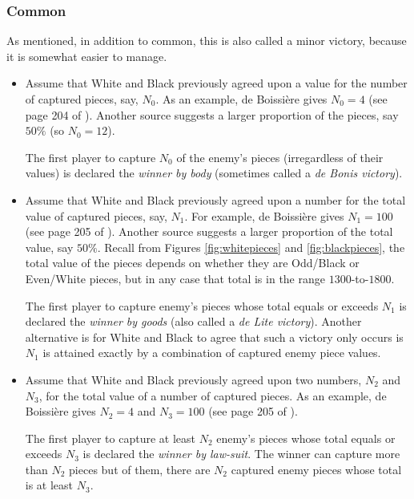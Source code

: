 \documentclass[14pt]{extarticle}
\begin{document}
\subsubsection{Common}

As mentioned, in addition to common, this is also called a minor victory,
because it is somewhat easier to manage.

\begin{itemize}
\item
Assume that White and Black previously agreed upon a value for the
number of captured pieces, say, $N_0$. As an example, de Boissi\`ere
gives $N_0=4$ (see page 204 of \cite{Ri46}). Another source suggests
a larger proportion of the pieces, say $50\%$ (so $N_0 = 12$).

The first player to capture $N_0$ of the enemy's pieces (irregardless of their
values) is declared the {\it winner by body}
(sometimes called a {\it de Bonis victory}).

\item
Assume that White and Black previously agreed upon a number for the
total value of captured pieces, say, $N_1$. For example, de Boissi\`ere
gives $N_1=100$ (see page 205 of \cite{Ri46}). Another source suggests
a larger proportion of the total value, say $50 \%$.
Recall from Figures \ref{fig:whitepieces} and \ref{fig:blackpieces},
the total value of the pieces depends
on whether they are Odd/Black or Even/White pieces,
but in any case that total is in the range $1300$-to-$1800$.

The first player to capture enemy's pieces whose total
equals
or exceeds $N_1$ is declared the {\it winner by goods}
(also called a {\it de Lite victory}).
Another alternative is for White and Black to agree
that such a victory only occurs is $N_1$ is attained exactly by
a combination of captured enemy piece values.

\item
Assume that White and Black previously agreed upon two
numbers, $N_2$ and $N_3$, for the total value of a number of
captured pieces. As an example, de Boissi\`ere
gives $N_2=4$ and $N_3=100$ (see page 205 of \cite{Ri46}).

The first player to capture at least $N_2$ enemy's pieces whose total
equals or exceeds $N_3$ is declared the {\it winner by law-suit}.
The winner can capture more than $N_2$ pieces but of them,
there are $N_2$ captured enemy pieces whose total is
at least $N_3$.


\end{itemize}
\end{document}
